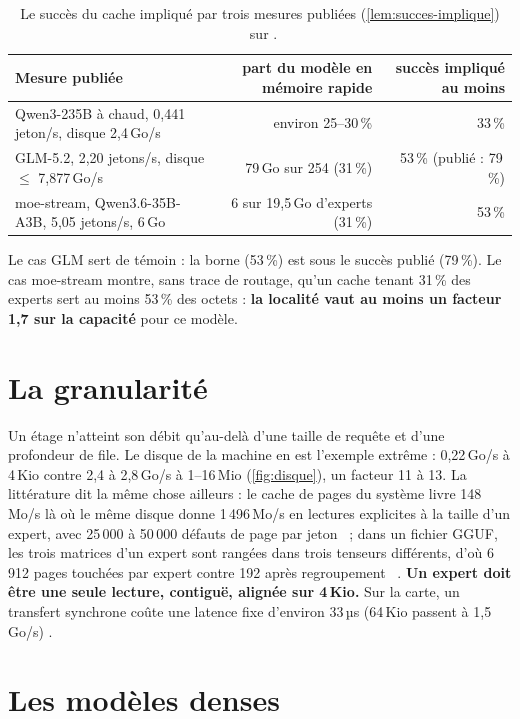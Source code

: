 \begin{table}[ht]
\centering\small
\caption[La localité lue dans des mesures publiées]{Le succès du cache impliqué par trois mesures publiées (\cref{lem:succes-implique}) \calc~sur \litt.}
\label{tab:succes-implique}
\begin{tabular}{@{}lrr@{}}
\toprule
Mesure publiée & part du modèle en mémoire rapide & succès impliqué au moins \\
\midrule
Qwen3-235B à chaud, 0,441 jeton/s, disque 2,4\,Go/s~\cite{cacheable2026} & environ 25--30\,\% & 33\,\% \\
GLM-5.2, 2,20 jetons/s, disque $\le$ 7,877\,Go/s~\cite{llamapr25294} & 79\,Go sur 254 (31\,\%) & 53\,\% (publié : 79\,\%) \\
moe-stream, Qwen3.6-35B-A3B, 5,05 jetons/s, 6\,Go~\cite{moestream2026} & 6 sur 19,5\,Go d'experts (31\,\%) & 53\,\% \\
\bottomrule
\end{tabular}
\end{table}

Le cas GLM sert de témoin : la borne (53\,\%) est sous le succès publié (79\,\%). Le cas moe-stream montre, sans trace de routage, qu'un cache tenant 31\,\% des experts sert au moins 53\,\% des octets : \textbf{la localité vaut au moins un facteur 1,7 sur la capacité} pour ce modèle.

\section{La granularité}\label{sec:granularite}

Un étage n'atteint son débit qu'au-delà d'une taille de requête et d'une profondeur de file. Le disque de la machine en est l'exemple extrême : 0,22\,Go/s à 4\,Kio contre 2,4 à 2,8\,Go/s à 1--16\,Mio (\cref{fig:disque}), un facteur 11 à 13. La littérature dit la même chose ailleurs : le cache de pages du système livre 148\,Mo/s là où le même disque donne 1\,496\,Mo/s en lectures explicites à la taille d'un expert, avec 25\,000 à 50\,000 défauts de page par jeton~\cite{moestream2026} ; dans un fichier GGUF, les trois matrices d'un expert sont rangées dans trois tenseurs différents, d'où 6\,912 pages touchées par expert contre 192 après regroupement~\cite{llama27149} \litt. \textbf{Un expert doit être une seule lecture, contiguë, alignée sur 4\,Kio.} Sur la carte, un transfert synchrone coûte une latence fixe d'environ 33\,µs (64\,Kio passent à 1,5\,Go/s) \mes.

\section{Les modèles denses}\label{sec:denses}

